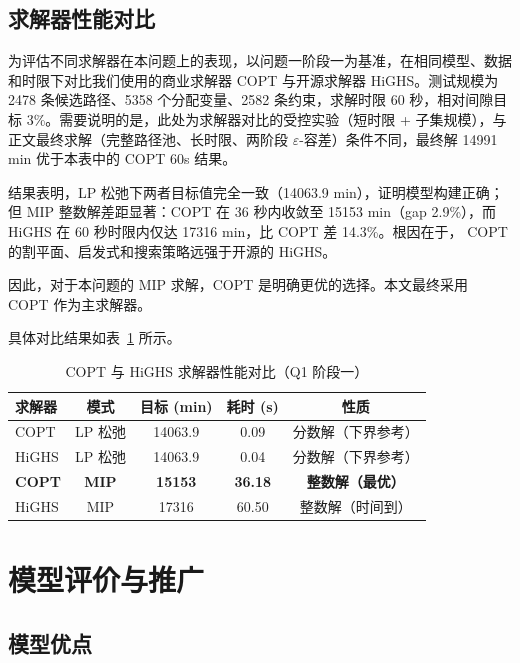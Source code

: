 \documentclass[withoutpreface]{cumcmthesis}
\begin{document}
\subsection{求解器性能对比}

为评估不同求解器在本问题上的表现，以问题一阶段一为基准，在相同模型、数据和时限下对比我们使用的商业求解器 COPT\cite{copt} 与开源求解器 HiGHS。测试规模为 2478 条候选路径、5358 个分配变量、2582 条约束，求解时限 60 秒，相对间隙目标 3\%。需要说明的是，此处为求解器对比的受控实验（短时限 + 子集规模），与正文最终求解（完整路径池、长时限、两阶段 $\varepsilon$-容差）条件不同，最终解 14991 min 优于本表中的 COPT 60s 结果。

结果表明，LP 松弛下两者目标值完全一致（14063.9 min），证明模型构建正确；但 MIP 整数解差距显著：COPT 在 36 秒内收敛至 15153 min（gap 2.9\%），而 HiGHS 在 60 秒时限内仅达 17316 min，比 COPT 差 14.3\%。根因在于， COPT 的割平面、启发式和搜索策略远强于开源的 HiGHS。

因此，对于本问题的 MIP 求解，COPT 是明确更优的选择。本文最终采用 COPT 作为主求解器。

具体对比结果如表~\ref{tab:solver_compare} 所示。

\begin{table}[htbp]
\centering
\caption{COPT 与 HiGHS 求解器性能对比（Q1 阶段一）}
\label{tab:solver_compare}
\begin{tabular}{lcccc}
\toprule
求解器 & 模式 & 目标 (min) & 耗时 (s) & 性质 \\
\midrule
COPT & LP 松弛 & 14063.9 & 0.09 & 分数解（下界参考） \\
HiGHS & LP 松弛 & 14063.9 & 0.04 & 分数解（下界参考） \\
\textbf{COPT} & \textbf{MIP} & \textbf{15153} & \textbf{36.18} & \textbf{整数解（最优）} \\
HiGHS & MIP & 17316 & 60.50 & 整数解（时间到） \\
\bottomrule
\end{tabular}
\end{table}

\section{模型评价与推广}

\subsection{模型优点}
\end{document}
